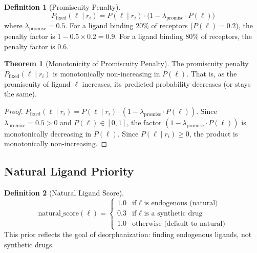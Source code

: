\documentclass[12pt,oneside]{article}
\theoremstyle{definition}
\newtheorem{definition}{Definition}[section]
\newtheorem{theorem}{Theorem}[section]
\begin{document}
\begin{definition}[Promiscuity Penalty]
\begin{equation}
P_{\text{fixed}}(\ell \mid r_i) = P(\ell \mid r_i) \cdot \bigl(1 - \lambda_{\text{promisc}} \cdot P(\ell)\bigr)
\label{eq:promiscuity_penalty}
\end{equation}
where $\lambda_{\text{promisc}} = 0.5$. For a ligand binding 20\% of receptors ($P(\ell) = 0.2$), the penalty factor is $1 - 0.5 \times 0.2 = 0.9$. For a ligand binding 80\% of receptors, the penalty factor is $0.6$.
\end{definition}

\begin{theorem}[Monotonicity of Promiscuity Penalty]
\label{thm:promiscuity_monotone}
The promiscuity penalty $P_{\text{fixed}}(\ell \mid r_i)$ is monotonically non-increasing in $P(\ell)$. That is, as the promiscuity of ligand $\ell$ increases, its predicted probability decreases (or stays the same).
\end{theorem}

\begin{proof}
$P_{\text{fixed}}(\ell \mid r_i) = P(\ell \mid r_i) \cdot (1 - \lambda_{\text{promisc}} \cdot P(\ell))$. Since $\lambda_{\text{promisc}} = 0.5 > 0$ and $P(\ell) \in [0, 1]$, the factor $(1 - \lambda_{\text{promisc}} \cdot P(\ell))$ is monotonically decreasing in $P(\ell)$. Since $P(\ell \mid r_i) \geq 0$, the product is monotonically non-increasing.
\end{proof}

\subsection{Natural Ligand Priority}

\begin{definition}[Natural Ligand Score]
\begin{equation}
\text{natural\_score}(\ell) = 
\begin{cases}
1.0 & \text{if } \ell \text{ is endogenous (natural)} \\
0.3 & \text{if } \ell \text{ is a synthetic drug} \\
1.0 & \text{otherwise (default to natural)}
\end{cases}
\label{eq:natural_score}
\end{equation}
This prior reflects the goal of deorphanization: finding endogenous ligands, not synthetic drugs.
\end{definition}
\end{document}
